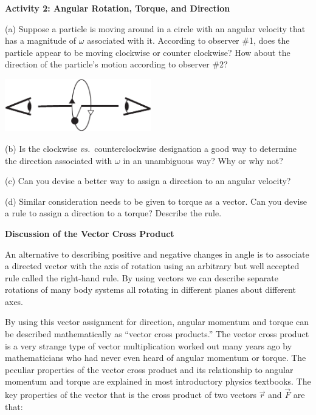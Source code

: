 \textbf{Activity 2: Angular Rotation, Torque, and Direction }

(a) Suppose a particle is moving around in a circle with an angular velocity
that has a magnitude of \( \omega  \) associated with it. According to observer
\#1, does the particle appear to be moving clockwise or counter clockwise? How
about the direction of the particle's motion according to observer \#2?

\vspace{0.3cm}
{\par\raggedright \includegraphics[height=0.9in]{ang_mom/ang_mom_fig2_new.eps} \par}
\vspace{0.3cm}

(b) Is the clockwise \textit{vs.}~counterclockwise designation a good way to determine
the direction associated with $\omega$ in an unambiguous way? Why or why not? 
\vspace{20mm}

(c) Can you devise a better way to assign a direction to an angular
velocity?
\vspace{20mm}

(d) Similar consideration needs to be given to torque as a vector. Can you devise
a rule to assign a direction to a torque? Describe the rule.
\vspace{20mm}

\textbf{Discussion of the Vector Cross Product }

An alternative to describing positive and negative changes in angle is to associate
a directed vector with the axis of rotation using an arbitrary but
well accepted rule called the right-hand rule. By using vectors we can describe
separate rotations of many body systems all rotating in different planes about
different axes. 

By using this vector assignment for direction, angular momentum and torque can
be described mathematically as ``vector cross products.'' The
vector cross product is a very strange type of vector multiplication worked
out many years ago by mathematicians who had never even heard of angular momentum or torque. The peculiar properties of the vector cross product and its relationship to angular momentum and torque are explained in most introductory physics textbooks.
The key properties of the vector that is the cross product of two vectors \( 
{\vec  r} \)
and \( {\vec  F} \) are that:


